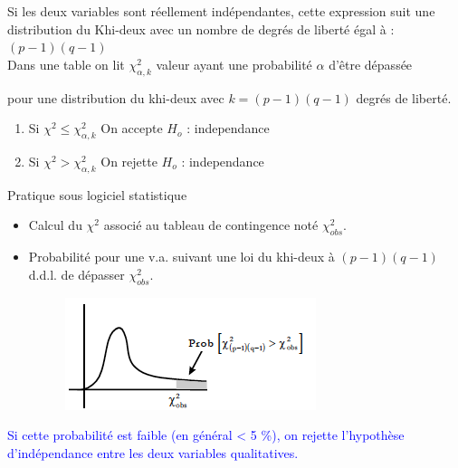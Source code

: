 \documentclass[11pt]{beamer}
\begin{document}
\begin{frame}{}

Si les deux variables sont réellement indépendantes, cette expression suit une distribution du Khi-deux avec un nombre de degrés de liberté égal
à : $(p -1) (q -1)$\\

Dans une table on lit $\chi_{\alpha,k}^2$ valeur ayant une probabilité
$\alpha$ d’être dépassée


pour une distribution du khi-deux avec $k = (p-1) (q -1)$
degrés de liberté.

\begin{enumerate}
\item Si $\chi^2\leq \chi_{\alpha,k}^2$  On accepte $H_o$ : independance 
\item  Si $\chi^2 > \chi_{\alpha,k}^2$  On rejette $H_o$ : independance 
\end{enumerate}

\end{frame}
\begin{frame}{Pratique sous logiciel statistique}

\begin{itemize}
\item  Calcul du $\chi^2$ associé au tableau de contingence noté $\chi^2_{obs}$.

\item Probabilité pour une v.a. suivant une loi du khi-deux à
$(p -1) (q -1)$ d.d.l. de dépasser $\chi^2_{obs}$.

\begin{figure}
\includegraphics[scale=0.8]{exemple7.png}  
\end{figure}

\end{itemize}


\textcolor{blue}{Si cette probabilité est faible (en général < 5 \%), on rejette l’hypothèse d’indépendance entre les deux variables qualitatives.}


\end{frame}
\end{document}
